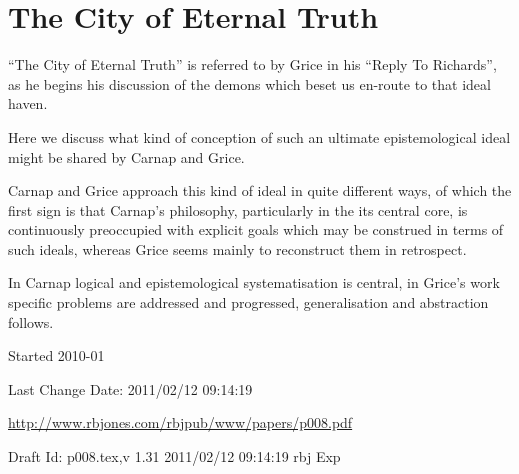 \documentclass[10pt,titlepage]{book}
\begin{document}
\chapter{The City of Eternal Truth}


``The City of Eternal Truth'' is referred to by Grice in his ``Reply To Richards''\cite{grice86b}, as he begins his discussion of the demons which beset us en-route to that ideal haven.

Here we discuss what kind of conception of such an ultimate epistemological ideal might be shared by Carnap and Grice.

Carnap and Grice approach this kind of ideal in quite different ways, of which the first sign is that Carnap's philosophy, particularly in the its central core, is continuously preoccupied with explicit goals which may be construed in terms of such ideals, whereas Grice seems mainly to reconstruct them in retrospect.

In Carnap logical and epistemological systematisation is central, in Grice's work specific problems are addressed and progressed, generalisation and abstraction follows.


\backmatter

%




\label{index}
{\twocolumn[]
{\small\printindex}}

\vfill

\tiny{
Started 2010-01

Last Change $ $Date: 2011/02/12 09:14:19 $ $

\href{http://www.rbjones.com/rbjpub/www/papers/p008.pdf}{http://www.rbjones.com/rbjpub/www/papers/p008.pdf}

Draft $ $Id: p008.tex,v 1.31 2011/02/12 09:14:19 rbj Exp $ $
}%
\end{document}
